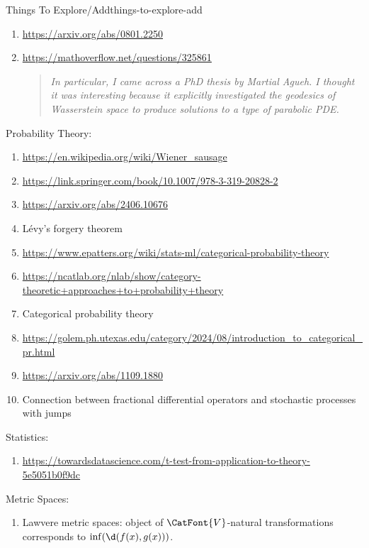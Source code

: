 \begin{remark}{Things To Explore/Add}{things-to-explore-add}
\begin{enumerate}
\begin{enumerate}
\[                    \]%
                    where $\rho_{\mu}$ is the probability density of $\mu$. Can we make this idea work?
            \end{enumerate}
        \item \url{https://arxiv.org/abs/0801.2250}
        \item \url{https://mathoverflow.net/questions/325861}
            \begin{quote}
                \textit{In particular, I came across a PhD thesis by Martial Agueh. I thought it was interesting because it explicitly investigated the geodesics of Wasserstein space to produce solutions to a type of parabolic PDE.}
            \end{quote}
    \end{enumerate}
    Probability Theory:
    \begin{enumerate}
        \item \url{https://en.wikipedia.org/wiki/Wiener_sausage}
        \item \href{https://link.springer.com/book/10.1007/978-3-319-20828-2}{https://link.springer.com/book/10.1007/978-3-319-20828-2}
        \item \url{https://arxiv.org/abs/2406.10676}
        \item Lévy's forgery theorem
        \item \url{https://www.epatters.org/wiki/stats-ml/categorical-probability-theory}
        \item \url{https://ncatlab.org/nlab/show/category-theoretic+approaches+to+probability+theory}
        \item Categorical probability theory
        \item \url{https://golem.ph.utexas.edu/category/2024/08/introduction_to_categorical_pr.html}
        \item \url{https://arxiv.org/abs/1109.1880}
        \item Connection between fractional differential operators and stochastic processes with jumps
    \end{enumerate}
    Statistics:
    \begin{enumerate}
        \item \url{https://towardsdatascience.com/t-test-from-application-to-theory-5e5051b0f9dc}
    \end{enumerate}
    Metric Spaces:
    \begin{enumerate}
        \item Lawvere metric spaces: object of $\CatFont{V}$-natural transformations corresponds to $\inf(\d(f(x),g(x)))$.

\end{enumerate}
\end{remark}

